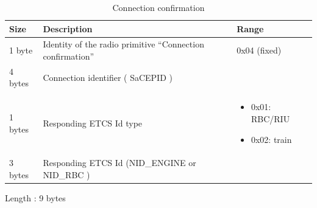 \documentclass[nocc]{template/openetcs_report}
\begin{document}
 			\begin{longtable}{|l|l|l|}
				\caption{Connection confirmation}\\ 
				\hline
				
					\begin{minipage}[t]{0.1\linewidth} \textbf{Size}	\end{minipage}
				&	\begin{minipage}[t]{0.5\linewidth} \textbf{Description}	\end{minipage}
				&	\begin{minipage}[t]{0.3\linewidth} \textbf{Range} \end{minipage} \\
				
				\hline
					 \begin{minipage}[t]{0.1\linewidth}1 byte \end{minipage}
					&\begin{minipage}[t]{0.6\linewidth}Identity of the radio primitive "`Connection confirmation"'	\end{minipage}
					&\begin{minipage}[t]{0.3\linewidth}0x04 (fixed) \end{minipage} \\
					
				\hline
					 \begin{minipage}[t]{0.1\linewidth}4 bytes \end{minipage}
					&\begin{minipage}[t]{0.6\linewidth}Connection identifier ( SaCEPID )	\end{minipage}
					&\begin{minipage}[t]{0.3\linewidth} \end{minipage} \\
					
				\hline
					 \begin{minipage}[t]{0.1\linewidth}1 bytes \end{minipage}
					&\begin{minipage}[t]{0.6\linewidth}Responding ETCS Id type	\end{minipage}
					&\begin{minipage}[t]{0.3\linewidth}
							\begin{itemize}
								\item 0x01: RBC/RIU
								\item 0x02: train
							\end{itemize}						
					  \end{minipage} \\
					
				\hline
					 \begin{minipage}[t]{0.1\linewidth}3 bytes \end{minipage}
					&\begin{minipage}[t]{0.6\linewidth}Responding ETCS Id (NID\_ENGINE or NID\_RBC )\end{minipage}
					&\begin{minipage}[t]{0.3\linewidth}\end{minipage} \\
				\hline
			\end{longtable}
			Length : 9 bytes
\end{document}

